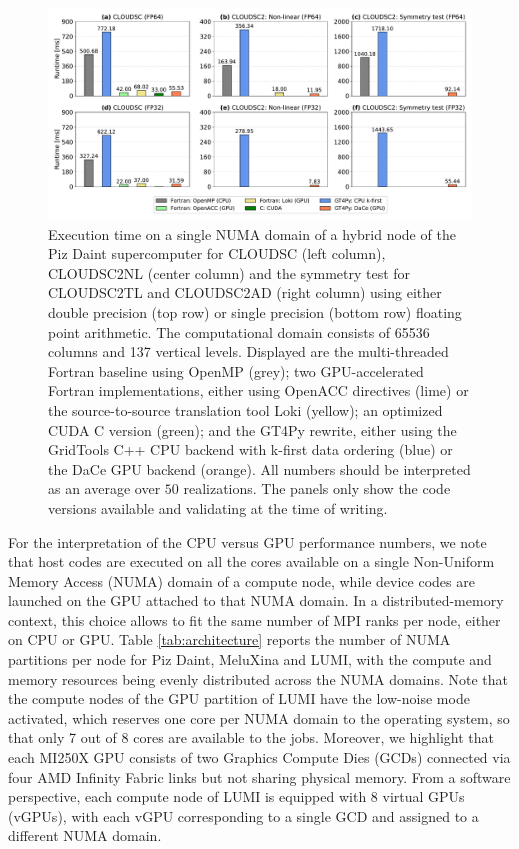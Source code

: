 \documentclass[gmd,manuscript,online]{copernicus}
\theoremstyle{theorem}
\theoremstyle{definition}
\theoremstyle{remark}
\theoremstyle{proposition}
\begin{document}
	\begin{figure}[t!]
		\centering
		\includegraphics[scale=0.44]{performance_daint_2.pdf}
		\caption{Execution time on a single NUMA domain of a hybrid node of the Piz Daint supercomputer for CLOUDSC (left column), CLOUDSC2NL (center column) and the symmetry test for CLOUDSC2TL and CLOUDSC2AD (right column) using either double precision (top row) or single precision (bottom row) floating point arithmetic. The computational domain consists of 65536 columns and 137 vertical levels. Displayed are the multi-threaded Fortran baseline using OpenMP (grey); two GPU-accelerated Fortran implementations, either using OpenACC directives (lime) or the source-to-source translation tool Loki (yellow); an optimized CUDA C version (green); and the GT4Py rewrite, either using the GridTools C++ CPU backend with k-first data ordering (blue) or the DaCe GPU backend (orange). All numbers should be interpreted as an average over $50$ realizations. The panels only show the code versions available and validating at the time of writing.}
		\label{fig:performance-daint}
	\end{figure}

	\noindent For the interpretation of the CPU versus GPU performance numbers, we note that host codes are executed on all the cores available on a single Non-Uniform Memory Access (NUMA) domain of a compute node, while device codes are launched on the GPU attached to that NUMA domain. In a distributed-memory context, this choice allows to fit the same number of MPI ranks per node, either on CPU or GPU. Table \ref{tab:architecture} reports the number of NUMA partitions per node for Piz Daint, MeluXina and LUMI, with the compute and memory resources being evenly distributed across the NUMA domains. Note that the compute nodes of the GPU partition of LUMI have the low-noise mode activated, which reserves one core per NUMA domain to the operating system, so that only 7 out of 8 cores are available to the jobs. Moreover, we highlight that each MI250X GPU consists of two Graphics Compute Dies (GCDs) connected via four AMD Infinity Fabric links but not sharing physical memory. From a software perspective, each compute node of LUMI is equipped with 8 virtual GPUs (vGPUs), with each vGPU corresponding to a single GCD and assigned to a different NUMA domain.
\end{document}
